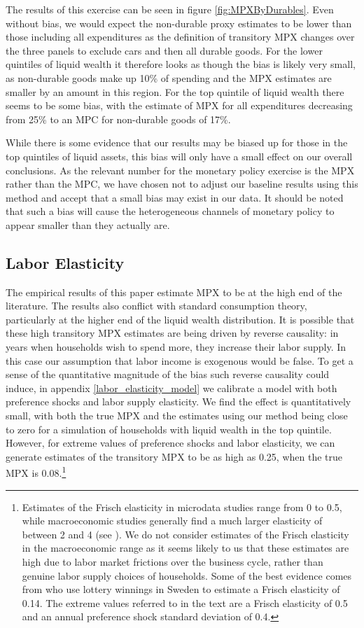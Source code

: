 \documentclass[titlepage]{\econtex}\newcommand{\texname}{ConsumptionHeterogeneity}
\begin{document}
The results of this exercise can be seen in figure \ref{fig:MPXByDurables}. Even without bias, we would expect the non-durable proxy estimates to be lower than those including all expenditures as the definition of transitory MPX changes over the three panels to exclude cars and then all durable goods. For the lower quintiles of liquid wealth it therefore looks as though the bias is likely very small, as non-durable goods make up 10\% of spending and the MPX estimates are smaller by an amount in this region. For the top quintile of liquid wealth there seems to be some bias, with the estimate of MPX for all expenditures decreasing from 25\% to an MPC for non-durable goods of 17\%.

While there is some evidence that our results may be biased up for those in the top quintiles of liquid assets, this bias will only have a small effect on our overall conclusions. As the relevant number for the monetary policy exercise is the MPX rather than the MPC, we have chosen not to adjust our baseline results using this method and accept that a small bias may exist in our data. It should be noted that such a bias will cause the heterogeneous channels of monetary policy to appear smaller than they actually are.

\subsection{Labor Elasticity} \label{labor_elasticity}
The empirical results of this paper estimate MPX to be at the high end of the literature. The results also conflict with standard consumption theory, particularly at the higher end of the liquid wealth distribution. It is possible that these high transitory MPX estimates are being driven by reverse causality: in years when households wish to spend more, they increase their labor supply. In this case our assumption that labor income is exogenous would be false. To get a sense of the quantitative magnitude of the bias such reverse causality could induce, in appendix \ref{labor_elasticity_model} we calibrate a model with both preference shocks and labor supply elasticity. We find the effect is quantitatively small, with both the true MPX and the estimates using our method being close to zero for a simulation of households with liquid wealth in the top quintile. However, for extreme values of preference shocks and labor elasticity, we can generate estimates of the transitory MPX to be as high as 0.25, when the true MPX is 0.08.\footnote{Estimates of the Frisch elasticity in microdata studies range from 0 to 0.5, while macroeconomic studies generally find a much larger elasticity of between 2 and 4 (see \cite{peterman_reconciling_2016}). We do not consider estimates of the Frisch elasticity in the macroeconomic range as it seems likely to us that these estimates are high due to labor market frictions over the business cycle, rather than genuine labor supply choices of households. Some of the best evidence comes from \cite{cesarini_effect_2017} who use lottery winnings in Sweden to estimate a Frisch elasticity of 0.14. The extreme values referred to in the text are a Frisch elasticity of 0.5 and an annual preference shock standard deviation of 0.4.}
\end{document}
